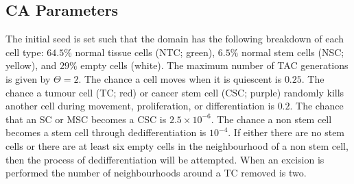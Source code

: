 \documentclass[\main/thesis.tex]{subfiles}
\begin{document}
\subsection{CA Parameters}

The initial seed is set such that the domain has the following breakdown of each cell type: $64.5 \%$ normal tissue cells (NTC; green), $6.5 \%$ normal stem cells (NSC; yellow), and $29 \%$ empty cells (white). The maximum number of TAC generations is given by $\Theta {=} 2$. The chance a cell moves when it is quiescent is $0.25$. The chance a tumour cell (TC; red) or cancer stem cell (CSC; purple) randomly kills another cell during movement, proliferation, or differentiation is $0.2$. The chance that an SC or MSC becomes a CSC is $2.5{\times}10^{\minus 6}$. The chance a non stem cell becomes a stem cell through dedifferentiation is $10^{\minus 4}$. If either there are no stem cells or there are at least six empty cells in the neighbourhood of a non stem cell, then the process of dedifferentiation will be attempted. When an excision is performed the number of neighbourhoods around a TC removed is two.
\end{document}
